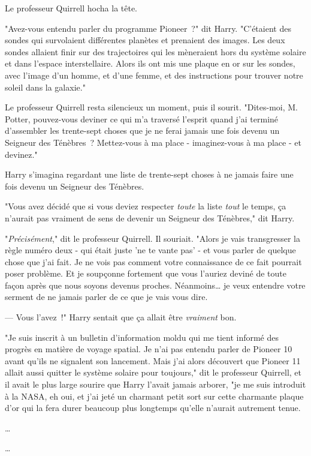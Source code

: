 Le professeur Quirrell hocha la tête.

"Avez-vous entendu parler du programme Pioneer~?" dit Harry. "C'étaient des sondes qui survolaient différentes planètes et prenaient des images. Les deux sondes allaient finir sur des trajectoires qui les mèneraient hors du système solaire et dans l'espace interstellaire. Alors ils ont mis une plaque en or sur les sondes, avec l'image d'un homme, et d'une femme, et des instructions pour trouver notre soleil dans la galaxie."

Le professeur Quirrell resta silencieux un moment, puis il sourit. "Dites-moi, M. Potter, pouvez-vous deviner ce qui m'a traversé l'esprit quand j'ai terminé d'assembler les trente-sept choses que je ne ferai jamais une fois devenu un Seigneur des Ténèbres~? Mettez-vous à ma place - imaginez-vous à ma place - et devinez."

Harry s'imagina regardant une liste de trente-sept choses à ne jamais faire une fois devenu un Seigneur des Ténèbres.

"Vous avez décidé que si vous deviez respecter \emph{toute} la liste \emph{tout} le temps, ça n'aurait pas vraiment de sens de devenir un Seigneur des Ténèbres," dit Harry.

"\emph{Précisément}," dit le professeur Quirrell. Il souriait. "Alors je vais transgresser la règle numéro deux - qui était juste 'ne te vante pas' - et vous parler de quelque chose que j'ai fait. Je ne vois pas comment votre connaissance de ce fait pourrait poser problème. Et je soupçonne fortement que vous l'auriez deviné de toute façon après que nous soyons devenus proches. Néanmoins… je veux entendre votre serment de ne jamais parler de ce que je vais vous dire.

--- Vous l'avez~!" Harry sentait que ça allait être \emph{vraiment} bon.

"Je suis inscrit à un bulletin d'information moldu qui me tient informé des progrès en matière de voyage spatial. Je n'ai pas entendu parler de Pioneer 10 avant qu'ils ne signalent son lancement. Mais j'ai alors découvert que Pioneer 11 allait aussi quitter le système solaire pour toujours," dit le professeur Quirrell, et il avait le plus large sourire que Harry l'avait jamais arborer, "je me suis introduit à la NASA, eh oui, et j'ai jeté un charmant petit sort sur cette charmante plaque d'or qui la fera durer beaucoup plus longtemps qu'elle n'aurait autrement tenue.

…

…

